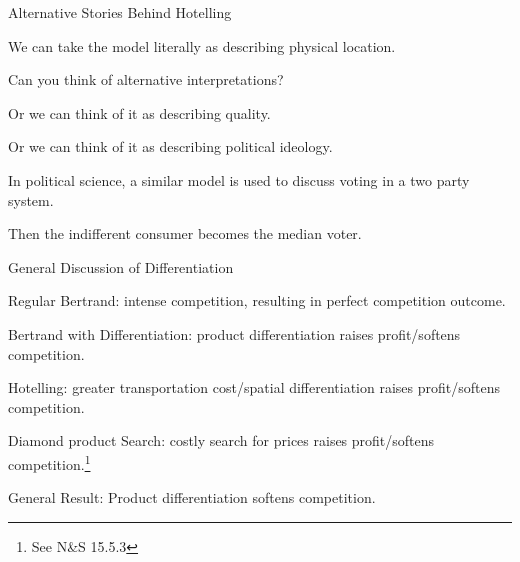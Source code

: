 \documentclass[aspectratio=169]{beamer}
\newenvironment{wideitemize}{\itemize\addtolength{\itemsep}{10pt}}{\enditemize}
\begin{document}
\begin{frame}{Alternative Stories Behind Hotelling}
\begin{wideitemize}
    \item We can take the model literally as describing physical location.
    \item Can you think of alternative interpretations?\pause
    \item Or we can think of it as describing quality.
    \item Or we can think of it as describing political ideology.
    \item In political science, a similar model is used to discuss voting in a two party system.
    \item Then the indifferent consumer becomes the median voter.
\end{wideitemize}
    
\end{frame}


\begin{frame}{General Discussion of Differentiation}
\begin{wideitemize}
    \item Regular Bertrand: intense competition, resulting in perfect competition outcome.
    \item Bertrand with Differentiation: product differentiation raises profit/softens competition.
    \item Hotelling: greater transportation cost/spatial differentiation raises profit/softens competition.
    \item Diamond product Search: costly search for prices raises profit/softens competition.\footnote{See N\&S 15.5.3}
    \item General Result: Product differentiation softens competition.
    
\end{wideitemize}
    
\end{frame}
\end{document}
